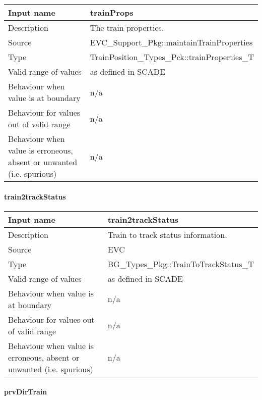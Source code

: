 \begin{longtable}{p{}p{}}
\toprule
Input name				& trainProps \\
\midrule
Description				& The train properties. \\
\midrule
Source					& EVC\_Support\_Pkg::maintainTrainProperties \\ 
\midrule
Type					& TrainPosition\_Types\_Pck::trainProperties\_T \\
\midrule
Valid range of values	& as defined in SCADE \\
\midrule
Behaviour when value is at boundary	& n/a \\
\midrule
Behaviour for values out of valid range	& n/a \\
\midrule
Behaviour when value is erroneous, absent or unwanted (i.e. spurious) & n/a \\
\bottomrule
\end{longtable}

\paragraph{train2trackStatus}

\begin{longtable}{p{}p{}}
\toprule
Input name				& train2trackStatus \\
\midrule
Description				& Train to track status information. \\
\midrule
Source					& EVC \\ 
\midrule
Type					& BG\_Types\_Pkg::TrainToTrackStatus\_T \\
\midrule
Valid range of values	& as defined in SCADE \\
\midrule
Behaviour when value is at boundary	& n/a \\
\midrule
Behaviour for values out of valid range	& n/a \\
\midrule
Behaviour when value is erroneous, absent or unwanted (i.e. spurious) & n/a \\
\bottomrule
\end{longtable}

\paragraph{prvDirTrain}

